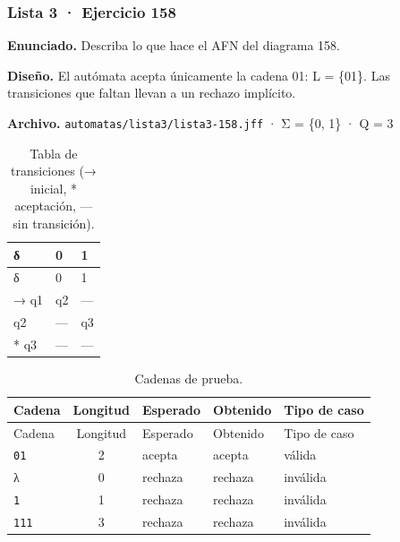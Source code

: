 
\hypertarget{lista-3-ejercicio-158}{%
\subsubsection{Lista 3 · Ejercicio 158}\label{lista-3-ejercicio-158}}

\textbf{Enunciado.} Describa lo que hace el AFN del diagrama 158.

\textbf{Diseño.} El autómata acepta únicamente la cadena 01: L = \{01\}. Las transiciones que faltan llevan a un rechazo implícito.

\textbf{Archivo.} \texttt{automatas/lista3/lista3-158.jff} · Σ = \{0, 1\} · \textbar Q\textbar{} = 3

\begin{longtable}[]{@{}lll@{}}
\caption{Tabla de transiciones (→ inicial, * aceptación, --- sin transición).}\tabularnewline
\toprule\noalign{}
δ & 0 & 1 \\
\midrule\noalign{}
\endfirsthead
\toprule\noalign{}
δ & 0 & 1 \\
\midrule\noalign{}
\endhead
\bottomrule\noalign{}
\endlastfoot
→ q1 & q2 & --- \\
q2 & --- & q3 \\
* q3 & --- & --- \\
\end{longtable}

\begin{longtable}[]{@{}lclll@{}}
\caption{Cadenas de prueba.}\tabularnewline
\toprule\noalign{}
Cadena & Longitud & Esperado & Obtenido & Tipo de caso \\
\midrule\noalign{}
\endfirsthead
\toprule\noalign{}
Cadena & Longitud & Esperado & Obtenido & Tipo de caso \\
\midrule\noalign{}
\endhead
\bottomrule\noalign{}
\endlastfoot
\texttt{01} & 2 & acepta & acepta & válida \\
λ & 0 & rechaza & rechaza & inválida \\
\texttt{1} & 1 & rechaza & rechaza & inválida \\
\texttt{111} & 3 & rechaza & rechaza & inválida \\
\end{longtable}


